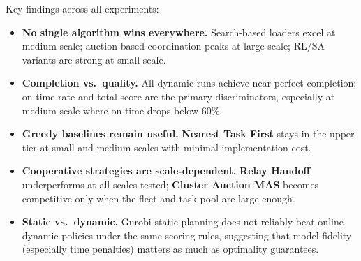 Key findings across all experiments:

\begin{itemize}[leftmargin=4em]
    \item \textbf{No single algorithm wins everywhere.} Search-based loaders excel at medium scale; auction-based coordination peaks at large scale; RL/SA variants are strong at small scale.
    \item \textbf{Completion vs.\ quality.} All dynamic runs achieve near-perfect completion; on-time rate and total score are the primary discriminators, especially at medium scale where on-time drops below 60\%.
    \item \textbf{Greedy baselines remain useful.} \textbf{Nearest Task First} stays in the upper tier at small and medium scales with minimal implementation cost.
    \item \textbf{Cooperative strategies are scale-dependent.} \textbf{Relay Handoff} underperforms at all scales tested; \textbf{Cluster Auction MAS} becomes competitive only when the fleet and task pool are large enough.
    \item \textbf{Static vs.\ dynamic.} Gurobi static planning does not reliably beat online dynamic policies under the same scoring rules, suggesting that model fidelity (especially time penalties) matters as much as optimality guarantees.
\end{itemize}
